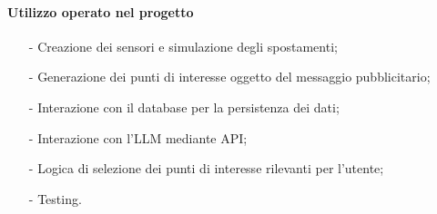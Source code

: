 \documentclass[10pt]{article}
\begin{document}
\begin{justify}
        \paragraph{Utilizzo operato nel progetto}
            \begin{itemize}
                \item[-] Creazione dei sensori e simulazione degli spostamenti;
                \item[-] Generazione dei punti di interesse oggetto del messaggio pubblicitario;
                \item[-] Interazione con il database per la persistenza dei dati;
                \item[-] Interazione con l'LLM mediante API;
                \item[-] Logica di selezione dei punti di interesse rilevanti per l'utente;
                \item[-] Testing.
            \end{itemize}

\end{justify}
\end{document}
